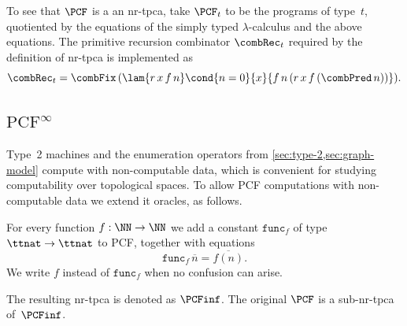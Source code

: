 To see that $\PCF$ is a an nr-tpca, take $\PCF_t$ to be the programs of
type~$t$, quotiented by the equations of the simply typed $\lambda$-calculus and the above equations.
%
The primitive recursion combinator $\combRec_t$ required by the definition of nr-tpca is implemented as
%
\begin{equation*}  
  \combRec_t =
  \combFix \,
  (\lam{r\,x\,f\,n}
            \cond{n = 0}{x}{f\,n\,(r \, x\, f \, (\combPred\, n))}).
\end{equation*}

\subsection[\texorpdfstring{$\text{PCF}^\infty$}{PCF-infinity}]{$\text{PCF}^\infty$}

Type~2 machines and the enumeration operators from \cref{sec:type-2,sec:graph-model}
compute with non-computable data, which is convenient for studying computability over topological spaces. To allow PCF computations with non-computable data we extend it oracles, as follows.

For every function $f : \NN \to \NN$ we add a constant $\mathtt{func}_f$
of type $\ttnat \to \ttnat$ to PCF, together with equations
%
\begin{equation*}
  \mathtt{func}_f \, \overline{n} = \overline{f(n)}.
\end{equation*}
%
We write $f$ instead of $\mathtt{func}_f$ when no confusion can arise.

The resulting nr-tpca is denoted as $\PCFinf$. The original $\PCF$ is a sub-nr-tpca of~$\PCFinf$.



